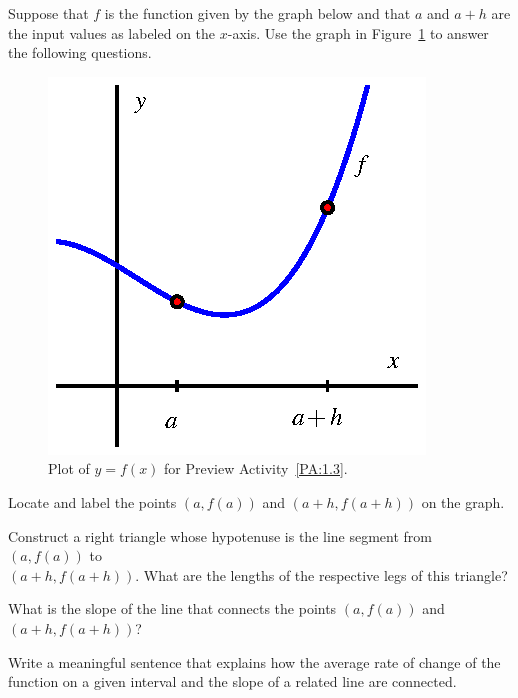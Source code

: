 \begin{pa} \label{PA:1.3}
Suppose that $f$ is the function given by the graph below and that $a$ and $a+h$ are the input values as labeled on the $x$-axis.  Use the graph in Figure~\ref{F:1.3.PA1} to answer the following questions.

\begin{figure}[h]
\begin{center}
\includegraphics{figures/1_3_PA1.eps}
\caption{Plot of $y = f(x)$ for Preview Activity~\ref{PA:1.3}.} \label{F:1.3.PA1}
\end{center}
\end{figure}
\ba
	\item Locate and label the points $(a,f(a))$ and $(a+h, f(a+h))$ on the graph.
	\item Construct a right triangle whose hypotenuse is the line segment from $(a,f(a))$ to \\ $(a+h,f(a+h))$.  What are the lengths of the respective legs of this triangle?
	\item What is the slope of the line that connects the points $(a,f(a))$ and $(a+h, f(a+h))$?
	\item Write a meaningful sentence that explains how the average rate of change of the function on a given interval and the slope of a related line are connected.
\ea
\end{pa} \afterpa